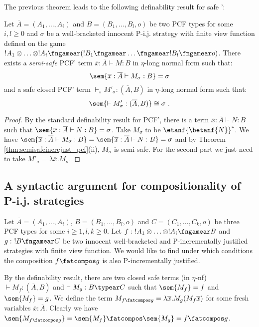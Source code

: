 The previous theorem leads to the following definability result for safe \pcf':
\begin{proposition}
\label{prop:safetydefinability}
Let $\overline{A}=(A_1,\ldots, A_i)$ and $B =(B_1, \ldots, B_l,o)$ be two PCF types for some $i,l\geq 0$ and $\sigma$ be a well-bracketed innocent
P-i.j. strategy with finite view function defined on the game $!A_1 \otimes \ldots \otimes !A_i \fngamear (!B_1 \fngamear \ldots \fngamear !B_l \fngamear o) $. There exists a \emph{semi-safe} PCF' term $\overline{x} : \overline{A} \vdash M : B$ in $\eta$-long normal form such that:
$$ \sem{\overline{x} : \overline{A} \vdash M_\sigma : B} = \sigma $$
and a safe closed PCF' term $\vdash_s M'_\sigma : (\overline{A},B)$ in $\eta$-long normal form such that:
$$ \sem{\vdash M'_\sigma : (\overline{A},B)} \cong \sigma \ .$$
\end{proposition}
\begin{proof}
By the standard definability result for PCF', there is a term $\overline{x} : \overline{A} \vdash N : B$ such that $\sem{\overline{x} :\overline{A} \vdash N : B} = \sigma$.
Take $M_\sigma$ to be $\etanf{\betanf{N}}^* $. We have $\sem{\overline{x} : \overline{A} \vdash M_\sigma : B} =  \sem{\overline{x} :\overline{A} \vdash N : B} = \sigma$ and by Theorem  \ref{thm:semisafeincrejust_pcf}(ii), $M_\sigma$ is semi-safe.
For the second part we just need to take $M'_\sigma = \lambda \overline{x}. M_\sigma$.
\end{proof}



\subsection{A syntactic argument for compositionality of P-i.j. strategies}

Let $\overline{A} = (A_1, \ldots, A_i)$,
$B = (B_1, \ldots, B_l,o)$
and $C=(C_1,\ldots,C_k,o)$ be three PCF types
for some $i\geq 1,l,k\geq 0$. Let
$f:\ !A_1 \otimes \ldots \otimes !A_i \fngamear B$ and $g:\ !B\fngamear C$ be two innocent well-bracketed and P-incrementally justified strategies with finite view function.
We would like to find under which conditions the composition $f\fatcompos g$ is also P-incrementally justified.

By the definability result, there are two closed safe terms (in $\eta$-nf) $\vdash M_f :(\overline{A},B)$  and $\vdash M_g :B \typear C$ such that $\sem{M_f} = f$
and $\sem{M_f} = g$.
We define the term $M_{f\fatcompos g} = \lambda \overline{x} . M_g (M_f \overline{x})$ for some fresh variables $\overline{x} : \overline{A}$. Clearly we have $\sem{M_{f\fatcompos g}} = \sem{M_f} \fatcompos \sem{M_g} = f\fatcompos g$.

